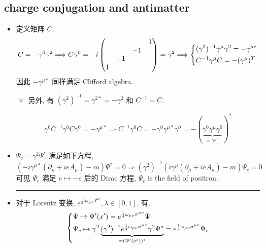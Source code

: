 \subsection{charge conjugation and antimatter}
\begin{itemize}
	\item 定义矩阵 $C$,
	\begin{equation}
		C = - \gamma^0 \gamma^2 \Longrightarrow C \gamma^0 = - i \begin{pmatrix}
			& & & 1 \\
			& & - 1 & \\
			& - 1 & & \\
			1 & & &
		\end{pmatrix} = \gamma^2 \Longrightarrow \begin{dcases}
			(\gamma^2)^{- 1} \gamma^\mu \gamma^2 = - \gamma^{\mu *} \\
			C^{- 1} \gamma^\mu C = - (\gamma^\mu)^T
		\end{dcases}
	\end{equation}
	因此 $- \gamma^{\mu *}$ 同样满足 Clifford algebra.
	\begin{itemize}
		\item 另外, 有 $(\gamma^2)^{- 1} = \gamma^{2 *} = - \gamma^2$ 和 $C^{- 1} = C$.
	\end{itemize}
	
	\begin{tcolorbox}[title=calculation:]
		\begin{equation}
			\gamma^0 C^{- 1} \gamma^0 C \gamma^0 = - \gamma^{\mu *} \Longrightarrow C^{- 1} \gamma^0 C = - \gamma^0 \gamma^{\mu *} \gamma^0 = - (\underbrace{\gamma^0 \gamma^\mu \gamma^0}_{= \gamma^{\mu \dag}})^*
		\end{equation}
	\end{tcolorbox}
	
	\item $\Psi_c = \gamma^2 \Psi^*$ 满足如下方程,
	\begin{equation}
		(- i \gamma^{\mu *} (\partial_\mu + i e A_\mu) - m) \Psi^* = 0 \Longrightarrow (\gamma^2)^{- 1} (i \gamma^\mu (\partial_\mu + i e A_\mu) - m) \Psi_c = 0
	\end{equation}
	可见 $\Psi_c$ 满足 $e \mapsto - e$ 后的 Dirac 方程, $\Psi_c$ is the field of positron.
	
	\noindent\rule[0.5ex]{\linewidth}{0.5pt} %
	
	\item 对于 Lorentz 变换, $e^{\frac{1}{2} \lambda \omega_{\mu \nu} J^{\mu \nu}}, \lambda \in [0, 1]$, 有,
	\begin{equation}
		\begin{dcases}
			\Psi \mapsto \Psi'(x') = e^{\frac{1}{4} \omega_{\mu \nu} \sigma^{\mu \nu}} \Psi \\
			\Psi_c \mapsto \gamma^2 \underbrace{(\gamma^2)^{- 1}  e^{\frac{1}{4} \omega_{\mu \nu} \sigma^{\mu \nu}} \gamma^2 \Psi^*}_{= (\Psi'(x'))^*} = e^{\frac{1}{4} \omega_{\mu \nu} \sigma^{\mu \nu}} \Psi_c
		\end{dcases}
	\end{equation}
\end{itemize}

